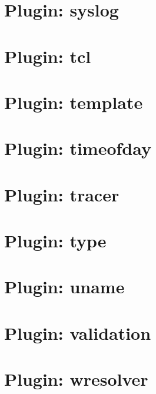 \documentclass[twoside]{book}
\newcommand{\+}{\discretionary{\mbox{\scriptsize$\hookleftarrow$}}{}{}}
\begin{document}
\chapter{Plugin\+: syslog}
\label{md_src_plugins_syslog_README}

\chapter{Plugin\+: tcl}
\label{md_src_plugins_tcl_README}

\chapter{Plugin\+: template}
\label{md_src_plugins_template_README}

\chapter{Plugin\+: timeofday}
\label{md_src_plugins_timeofday_README}

\chapter{Plugin\+: tracer}
\label{md_src_plugins_tracer_README}

\chapter{Plugin\+: type}
\label{md_src_plugins_type_README}

\chapter{Plugin\+: uname}
\label{md_src_plugins_uname_README}

\chapter{Plugin\+: validation}
\label{md_src_plugins_validation_README}

\chapter{Plugin\+: wresolver}
\label{md_src_plugins_wresolver_README}

\end{document}
